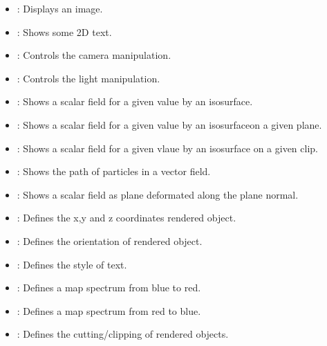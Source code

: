 \begin{itemize}
\item \Image: Displays an image.
\item \Text: Shows some 2D text.
\item \Camera: Controls the camera manipulation. 
\item \Light: Controls the light manipulation.
\item \IsoSurface: Shows a scalar field for a given value by 
an isosurface.
\item \IsoSurfaceOnPlane: Shows a scalar field for a given value by 
an isosurfaceon a given plane.
\item \IsoSurfaceOnClip: Shows a scalar field for a given vlaue by 
an isosurface on a given clip.
\item \StreamLines: Shows the path of particles in a vector field.
\item \Carpet: Shows a scalar field as plane deformated along 
the plane normal.
\item \Position: Defines the x,y and z coordinates rendered object.
\item \Transform: Defines the orientation of rendered object.
\item \Style: Defines the style of text.
\item \BlueToRed: Defines a map spectrum from blue to red.
\item \RedToBlue: Defines a map spectrum from red to blue.
\item \Plane: Defines the cutting/clipping of rendered objects.
\end{itemize}

